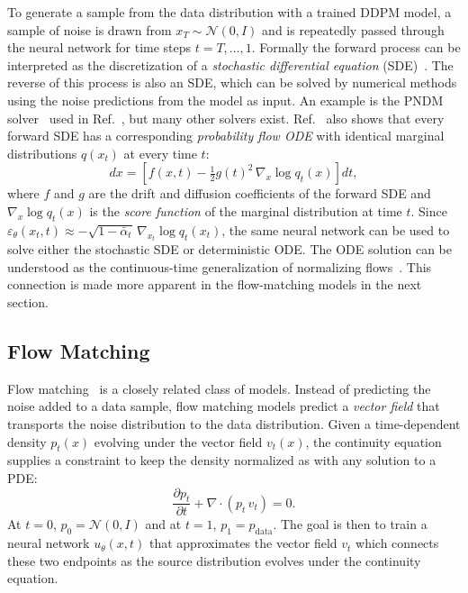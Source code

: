 To generate a sample from the data distribution with a trained DDPM model, a sample of noise is drawn from $x_T \sim \mathcal{N}(0, I)$ and is repeatedly passed through the neural network for time steps $t = T, \ldots, 1$.
Formally the forward process  can be interpreted as the discretization of a \textit{stochastic differential equation} (SDE)~\cite{Song:2021score}.
The reverse of this process is also an SDE, which can be solved by numerical methods using the noise predictions from the model as input.
An example is the PNDM solver~\cite{liu2022pseudo} used in Ref.~\cite{Shmakov:2023kjj}, but many other solvers exist.
Ref.~\cite{Song:2021score} also shows that every forward SDE has a corresponding \textit{probability flow ODE} with identical marginal distributions $q(x_t)$ at every time $t$:
\begin{equation}
    dx = \left[f(x, t) - \tfrac{1}{2}g(t)^2\,\nabla_x \log q_t(x)\right] dt,
    \label{eqn:prob_flow_ode}
\end{equation}
where $f$ and $g$ are the drift and diffusion coefficients of the forward SDE and $\nabla_x \log q_t(x)$ is the \textit{score function} of the marginal distribution at time $t$.
Since $\varepsilon_\theta(x_t, t) \approx -\sqrt{1 - \bar\alpha_t}\,\nabla_{x_t} \log q_t(x_t)$, the same neural network can be used to solve either the stochastic SDE or deterministic ODE.
The ODE solution can be understood as the continuous-time generalization of normalizing flows~\cite{chen2018neural}.
This connection is made more apparent in the flow-matching models in the next section.

\subsection{Flow Matching}
\label{sec:flow_matching}

Flow matching~\cite{lipman2022flow} is a closely related class of models.
Instead of predicting the noise added to a data sample, flow matching models predict a \textit{vector field} that transports the noise distribution to the data distribution.
Given a time-dependent density $p_t(x)$ evolving under the vector field $v_t(x)$, the continuity equation supplies a constraint to keep the density normalized as with any solution to a PDE:
\begin{equation}
    \frac{\partial p_t}{\partial t} + \nabla \cdot (p_t\,v_t) = 0.
    \label{eqn:continuity}
\end{equation}
At $t = 0$, $p_0 = \mathcal{N}(0, I)$ and at $t=1$, $p_1 = p_\text{data}$.
The goal is then to train a neural network $u_\theta(x, t)$ that approximates the vector field $v_t$ which connects these two endpoints as the source distribution evolves under the continuity equation.

